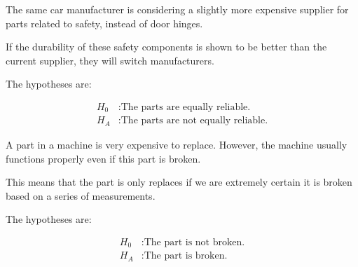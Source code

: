 \documentclass{beamer}
\begin{document}
\begin{frame}
  \begin{example}
    The same car manufacturer is considering a slightly more expensive supplier for parts related to safety, instead of door hinges.\pause

    \vspace{1mm}
    If the durability of these safety components is shown to be better than the current supplier, they will switch manufacturers.\pause

    \vspace{1mm}
    The hypotheses are:

    \vspace{-2mm}
    \begin{equation*}
      \begin{aligned}
        H_0 &: \text{The parts are equally reliable.} \\
        H_A &: \text{The parts are not equally reliable.}
      \end{aligned}
    \end{equation*}\pause
    
    \vspace{-2mm}
    \pause
  \end{example}
\end{frame}

\begin{frame}
  \begin{example}
    A part in a machine is very expensive to replace. However, the machine usually functions properly even if this part is broken.\pause

    \vspace{1mm}
    This means that the part is only replaces if we are extremely certain it is broken based on a series of measurements.\pause

    \vspace{1mm}
    The hypotheses are:

    \vspace{-2mm}
    \begin{equation*}
      \begin{aligned}
        H_0 &: \text{The part is not broken.} \\
        H_A &: \text{The part is broken.}
      \end{aligned}
    \end{equation*}\pause

    \vspace{-2mm}
    \pause
  \end{example}
\end{frame}
\end{document}
